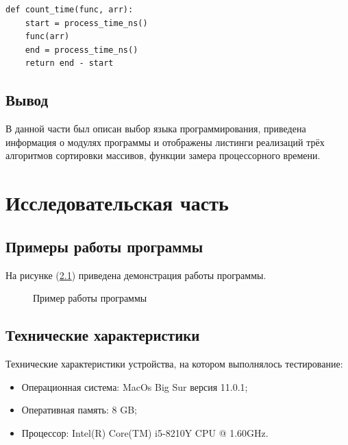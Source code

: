 \documentclass[12pt]{report}
\begin{document}
\begin{lstlisting}[label=some-code,caption=Функция замера процессорного времени]
def count_time(func, arr):
	start = process_time_ns()
	func(arr)
	end = process_time_ns()
	return end - start
\end{lstlisting}

\section{Вывод}
В данной части был описан выбор языка программирования, приведена информация о модулях программы и отображены листинги реализаций трёх алгоритмов сортировки массивов, функции замера процессорного времени.

\chapter{Исследовательская часть}

\section{Примеры работы программы}

На рисунке (\ref{ris:example}) приведена демонстрация работы программы.

\begin{figure}[h]
\caption{Пример работы программы}
\label{ris:example}
\end{figure}

\section{Технические характеристики}

Технические характеристики устройства, на котором выполнялось тестирование:

\begin{itemize}
	\item Операционная система: MacOs Big Sur версия 11.0.1;
	\item Оперативная память: 8 GB;
	\item Процессор: Intel(R) Core(TM) i5-8210Y CPU @ 1.60GHz.
\end{itemize}
\end{document}
